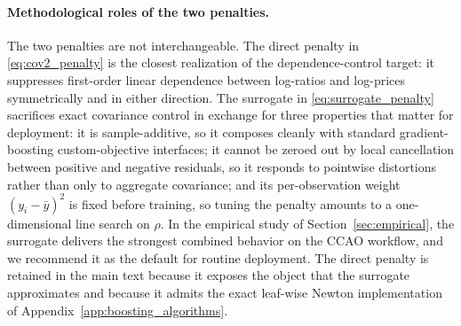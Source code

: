 \documentclass{article}
\theoremstyle{plain}
\theoremstyle{definition}
\newcommand{\1}{\mathbf{1}}
\begin{document}
\paragraph{Methodological roles of the two penalties.}
The two penalties are not interchangeable. The direct penalty in \eqref{eq:cov2_penalty} is the closest realization of the dependence-control target: it suppresses first-order linear dependence between log-ratios and log-prices symmetrically and in either direction. The surrogate in \eqref{eq:surrogate_penalty} sacrifices exact covariance control in exchange for three properties that matter for deployment: it is sample-additive, so it composes cleanly with standard gradient-boosting custom-objective interfaces; it cannot be zeroed out by local cancellation between positive and negative residuals, so it responds to pointwise distortions rather than only to aggregate covariance; and its per-observation weight $(y_i-\bar y)^2$ is fixed before training, so tuning the penalty amounts to a one-dimensional line search on $\rho$. In the empirical study of Section~\ref{sec:empirical}, the surrogate delivers the strongest combined behavior on the CCAO workflow, and we recommend it as the default for routine deployment. The direct penalty is retained in the main text because it exposes the object that the surrogate approximates and because it admits the exact leaf-wise Newton implementation of Appendix~\ref{app:boosting_algorithms}.




\end{document}
